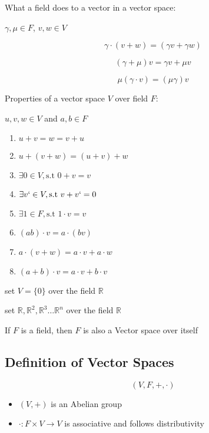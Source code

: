 \documentclass[11pt,a4paper]{colorart}
\def\l{\left}
\def\r{\right}
\def\R{\mathbb{R}}
\def\g{\gamma}
\begin{document}
What a field does to a vector in a vector space:

$\g, \mu \in F$, $v, w \in V$

\[ \g \cdot \l( v + w \r) = \l( \g v + \g w \r) \]

\[ \l( \g + \mu \r) v = \g v + \mu v \]

\[ \mu \l( \g \cdot v \r) = \l( \mu \g \r) v \]

Properties of a vector space $V$ over field $F$:

$u, v, w \in V$ and $a, b \in F$

\begin{enumerate}
	\item $ u + v = w = v + u $
	\item $ u + \l(v + w\r) = \l(u + v \r) + w$
	\item $ \exists 0 \in V, \text{s.t } 0 + v = v $
	\item $ \exists v` \in V, \text{s.t } v + v` = 0 $
	\item $ \exists 1 \in F, \text{s.t } 1 \cdot v = v $
	\item $ \l(ab\r) \cdot v = a\cdot \l(bv\r) $
	\item $ a \cdot \l( v+w\r) = a \cdot v + a \cdot w $
	\item $ \l(a+b\r) \cdot v = a\cdot v + b \cdot v $
\end{enumerate}

\begin{example}
	set $V = \{0\}$ over the field $\R$
\end{example}

\begin{example}
	set $\R, \R^2, \R^3 \dots \R^n$ over the field $\R$
\end{example}

\begin{remark}
	If $F$ is a field, then $F$ is also a Vector space over itself
\end{remark}

\subsection{Definition of Vector Spaces}

\begin{definition}
	\[ \l(V,F,+,\cdot\r) \]
	\begin{itemize}
		\item $\l(V,+\r)$ is an Abelian group
		\item $ \cdot : F \times V \rightarrow V $ is associative and follows distributivity
	\end{itemize}
\end{definition}
\end{document}
